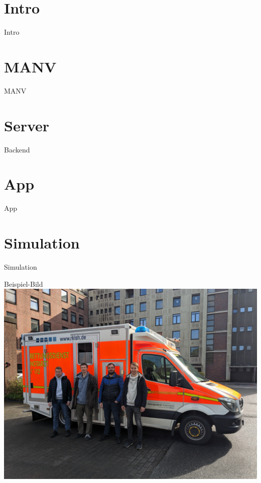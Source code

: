 %
%
\section{Intro}\label{sec:intro}

\begin{frame}{Intro}
\end{frame}


%
%
\section{MANV}

\begin{frame}{MANV}
\end{frame}


%
%
\section{Server}

\begin{frame}{Backend}
\end{frame}


%
%
\section{App}

\begin{frame}{App}
\end{frame}


%
%
\section{Simulation}

\begin{frame}{Simulation}
\end{frame}

\begin{frame}{Beispiel-Bild}
	\centering
	\includegraphics[height=.9\textheight]{images/PXL_20240426_144813969.jpg}
\end{frame}


%
%
\frame{\printbibliography}
